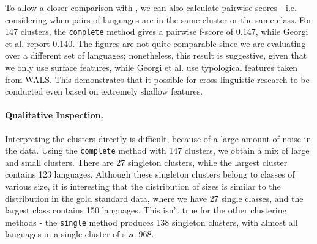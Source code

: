 To allow a closer comparison with , we can also calculate pairwise scores - i.e. considering when pairs of languages are in the same cluster or the same class. For 147 clusters, the \texttt{complete} method gives a pairwise f-score of 0.147, while Georgi et al. report 0.140. The figures are not quite comparable since we are evaluating over a different set of languages; nonetheless, this result is suggestive, given that we only use surface features, while Georgi et al. use typological features taken from WALS.  This demonstrates that it possible for cross-linguistic research to be conducted even based on extremely shallow features.





\paragraph{Qualitative Inspection.}
Interpreting the clusters directly is difficult, because of a large amount of noise in the data.
Using the \texttt{complete} method with 147 clusters, we obtain a mix of large and small clusters. There are 27 singleton clusters, while the largest cluster contains 123 languages. Although these singleton clusters belong to classes of various size, it is interesting that the distribution of sizes is similar to the distribution in the gold standard data, where we have 27 single classes, and the largest class contains 150 languages.  This isn't true for the other clustering methods - the \texttt{single} method produces 138 singleton clusters, with almost all languages in a single cluster of size 968.
